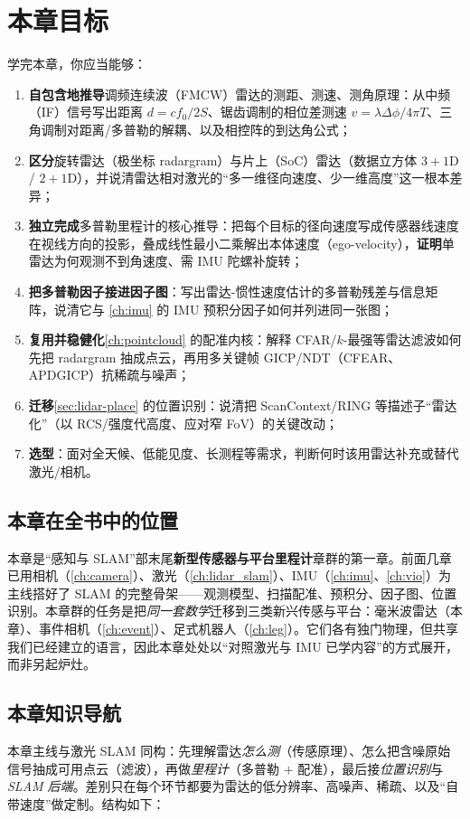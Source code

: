 \section*{本章目标}
学完本章，你应当能够：
\begin{enumerate}
  \item \textbf{自包含地推导}调频连续波（FMCW）雷达的测距、测速、测角原理：从中频（IF）信号写出距离 $d=cf_0/2S$、锯齿调制的相位差测速 $v=\lambda\Delta\phi/4\pi T$、三角调制对距离/多普勒的解耦、以及相控阵的到达角公式；
  \item \textbf{区分}旋转雷达（极坐标 radargram）与片上（SoC）雷达（数据立方体 $3{+}1$D / $2{+}1$D），并说清雷达相对激光的“多一维径向速度、少一维高度”这一根本差异；
  \item \textbf{独立完成}多普勒里程计的核心推导：把每个目标的径向速度写成传感器线速度在视线方向的投影，叠成线性最小二乘解出本体速度（ego-velocity），\textbf{证明}单雷达为何观测不到角速度、需 IMU 陀螺补旋转；
  \item \textbf{把多普勒因子接进因子图}：写出雷达-惯性速度估计的多普勒残差与信息矩阵，说清它与 \cref{ch:imu} 的 IMU 预积分因子如何并列进同一张图；
  \item \textbf{复用并稳健化}\cref{ch:pointcloud} 的配准内核：解释 CFAR/$k$-最强等雷达滤波如何先把 radargram 抽成点云，再用多关键帧 GICP/NDT（CFEAR、APDGICP）抗稀疏与噪声；
  \item \textbf{迁移}\cref{sec:lidar-place} 的位置识别：说清把 ScanContext/RING 等描述子“雷达化”（以 RCS/强度代高度、应对窄 FoV）的关键改动；
  \item \textbf{选型}：面对全天候、低能见度、长测程等需求，判断何时该用雷达补充或替代激光/相机。
\end{enumerate}

\subsection*{本章在全书中的位置}
本章是“感知与 SLAM”部末尾\textbf{新型传感器与平台里程计}章群的第一章。前面几章已用相机（\cref{ch:camera}）、激光（\cref{ch:lidar_slam}）、IMU（\cref{ch:imu}、\cref{ch:vio}）为主线搭好了 SLAM 的完整骨架——观测模型、扫描配准、预积分、因子图、位置识别。本章群的任务是把\emph{同一套数学}迁移到三类新兴传感与平台：毫米波雷达（本章）、事件相机（\cref{ch:event}）、足式机器人（\cref{ch:leg}）。它们各有独门物理，但共享我们已经建立的语言，因此本章处处以“对照激光与 IMU 已学内容”的方式展开，而非另起炉灶。

\subsection*{本章知识导航}
本章主线与激光 SLAM 同构：先理解雷达\emph{怎么测}（传感原理）、怎么把含噪原始信号抽成可用点云（滤波），再做\emph{里程计}（多普勒 $+$ 配准），最后接\emph{位置识别}与\emph{SLAM 后端}。差别只在每个环节都要为雷达的低分辨率、高噪声、稀疏、以及“自带速度”做定制。结构如下：

